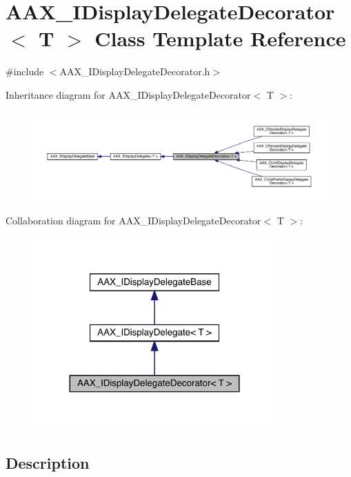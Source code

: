 \hypertarget{a01805}{}\section{A\+A\+X\+\_\+\+I\+Display\+Delegate\+Decorator$<$ T $>$ Class Template Reference}
\label{a01805}


{\ttfamily \#include $<$A\+A\+X\+\_\+\+I\+Display\+Delegate\+Decorator.\+h$>$}



Inheritance diagram for A\+A\+X\+\_\+\+I\+Display\+Delegate\+Decorator$<$ T $>$\+:
\nopagebreak
\begin{figure}[H]
\begin{center}
\leavevmode
\includegraphics[width=350pt]{a01804}
\end{center}
\end{figure}


Collaboration diagram for A\+A\+X\+\_\+\+I\+Display\+Delegate\+Decorator$<$ T $>$\+:
\nopagebreak
\begin{figure}[H]
\begin{center}
\leavevmode
\includegraphics[width=264pt]{a01803}
\end{center}
\end{figure}


\subsection{Description}
